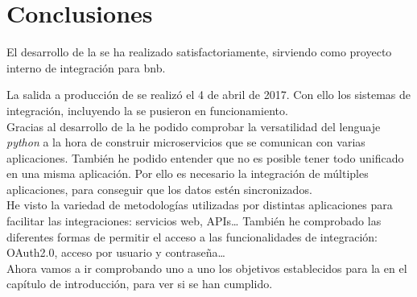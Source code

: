 \chapter{Conclusiones}

El desarrollo de la \iface{} se ha realizado satisfactoriamente, sirviendo como proyecto interno de integración para \acrshort{bnb}.

La salida a producción de \wday{} se realizó el 4 de abril de 2017. Con ello los sistemas de integración, incluyendo la \iface{} se pusieron en funcionamiento.\\



Gracias al desarrollo de la \iface{} he podido comprobar la versatilidad del lenguaje \textit{python} a la hora de construir microservicios que se comunican con varias aplicaciones.
También he podido entender que no es posible tener todo unificado en una misma aplicación. Por ello es necesario la integración de múltiples aplicaciones, para conseguir que los datos estén sincronizados.\\

He visto la variedad de metodologías utilizadas por distintas aplicaciones para facilitar las integraciones: servicios web, APIs\ldots
También he comprobado las diferentes formas de permitir el acceso a las funcionalidades de integración: OAuth2.0, acceso por usuario y contraseña\ldots\\





Ahora vamos a ir comprobando uno a uno los objetivos establecidos para la \iface{} en el capítulo de introducción, para ver si se han cumplido.

